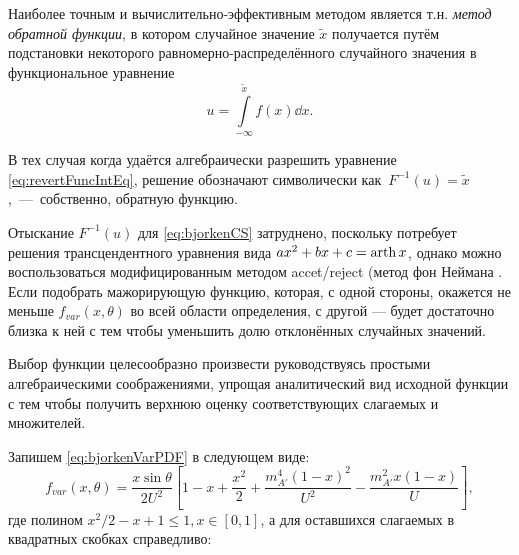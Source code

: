 Наиболее точным и вычислительно-эффективным методом является
т.н. \emph{метод обратной функции}, в котором случайное значение $\tilde{x}$ получается
путём подстановки некоторого равномерно-распределённого случайного значения в
функциональное уравнение
\begin{equation}
    u = \int\limits_{-\infty}^{\tilde{x}} f(x) \dd{x}.
\label{eq:revertFuncIntEq}
\end{equation}

В тех случая когда удаётся алгебраически разрешить уравнение
\eqref{eq:revertFuncIntEq}, решение обозначают символически
как~$F^{-1}(u) = \tilde{x}$,~---~собственно, обратную функцию.

Отыскание $F^{-1}(u)$ для \eqref{eq:bjorkenCS}
затруднено, поскольку потребует решения
трансцендентного уравнения вида $a x^2 + b x + c = \operatorname{arth} x$, однако можно
воспользоваться модифицированным методом accet/reject (метод фон Неймана
\cite{vonNeumannVarTechs}.
Если подобрать мажорирующую функцию, которая, с одной стороны, окажется не
меньше $f_{var}(x, \theta)$ во всей области определения, с другой ---
будет достаточно близка к ней с тем чтобы уменьшить долю отклонённых
случайных значений.


Выбор функции целесообразно произвести руководствуясь простыми алгебраическими
соображениями, упрощая аналитический вид исходной функции с тем чтобы получить
верхнюю оценку соответствующих слагаемых и множителей.

Запишем \eqref{eq:bjorkenVarPDF} в следующем виде:
\begin{equation}
    f_{var}(x, \theta) = \frac{x \sin \theta}{2 U^2} \left[
        1 - x + \frac{x^2}{2}
        + \frac{m_{A'}^4 (1-x)^2}{U^2}
        - \frac{m_{A'}^2 x (1-x)}{U}
        \right],
\end{equation}
где полином $x^2/2 - x + 1 \le 1, x \in [0,1]$, а для оставшихся слагаемых в
квадратных скобках справедливо:

